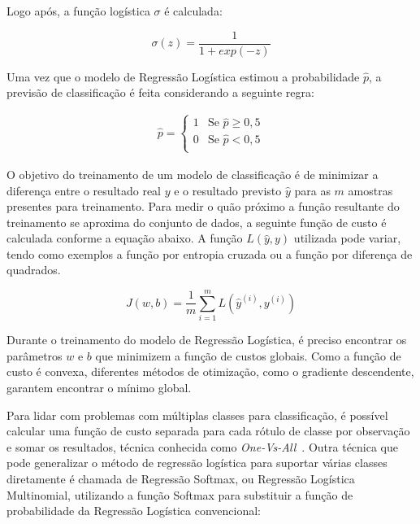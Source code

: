 \documentclass[Portugues,Final]{ic-tese-v3}
\begin{document}
Logo após, a função logística $\sigma$ é calculada:

\begin{equation}
\sigma (z) = \frac{1}{1 + exp(-z)}
\end{equation}

Uma vez que o modelo de Regressão Logística estimou a probabilidade $\hat{p}$, a previsão de classificação é feita considerando a seguinte regra:

\begin{equation}
	\begin{aligned}
	\hat{p} = 
	\begin{cases}
	1 & \text{Se $\hat{p} \geqslant 0,5$}\\
	0 & \text{Se $\hat{p} < 0,5$}\\
	\end{cases}
	\end{aligned}
\end{equation}

O objetivo do treinamento de um modelo de classificação é de minimizar a diferença entre o resultado real $y$ e o resultado previsto $\hat{y}$ para as $m$ amostras presentes para treinamento. Para medir o quão próximo a função resultante do treinamento se aproxima do conjunto de dados, a seguinte função de custo é calculada conforme a equação abaixo. A função $L(\hat{y}, y)$ utilizada pode variar, tendo como exemplos a função por entropia cruzada ou a função por diferença de quadrados.

\begin{equation}
J(w,b) = \frac{1}{m} \sum^{m}_{i=1} L(\hat{y}^{(i)}, y^{(i)})
\end{equation}

Durante o treinamento do modelo de Regressão Logística, é preciso encontrar os parâmetros $w$ e $b$ que minimizem a função de custos globais. Como a função de custo é convexa, diferentes métodos de otimização, como o gradiente descendente, garantem encontrar o mínimo global.

Para lidar com problemas com múltiplas classes para classificação, é possível calcular uma função de custo separada para cada rótulo de classe por observação e somar os resultados, técnica conhecida como \textit{One-Vs-All}~\cite{Rifkin_2004}. Outra técnica que pode generalizar o método de regressão logística para suportar várias classes diretamente é chamada de Regressão Softmax, ou Regressão Logística Multinomial, utilizando a função Softmax para substituir a função de probabilidade da Regressão Logística convencional:
\end{document}
